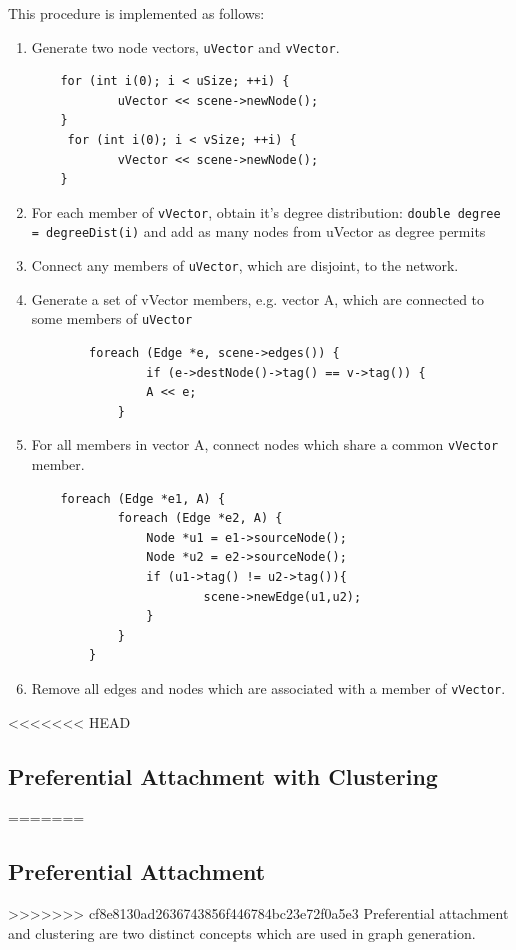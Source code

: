 \documentclass[a4paper,11pt,titlepage]{article}
\newcommand{\code}[1]{\texttt{#1}}
\begin{document}
This procedure is implemented as follows:
\begin{enumerate}
   \item Generate two node vectors, \code{uVector} and \code{vVector}.
\begin{lstlisting}
	for (int i(0); i < uSize; ++i) {
        	uVector << scene->newNode();
	}
	 for (int i(0); i < vSize; ++i) {
        	vVector << scene->newNode();
	}
\end{lstlisting}
   \item For each member of \code{vVector}, obtain it's degree distribution:
\code{double degree = degreeDist(i)} and add as many nodes from uVector as degree permits
   \item Connect any members of \code{uVector}, which are disjoint, to the network.
   \item Generate a set of vVector members, e.g. vector A, which are connected to some members of \code{uVector}
\begin{lstlisting}
       	foreach (Edge *e, scene->edges()) {
            	if (e->destNode()->tag() == v->tag()) {
                A << e;
            }
\end{lstlisting}
   \item For all members in vector A, connect nodes which share a common \code{vVector} member.
\begin{lstlisting}
	foreach (Edge *e1, A) {
            foreach (Edge *e2, A) {
                Node *u1 = e1->sourceNode();
                Node *u2 = e2->sourceNode();
                if (u1->tag() != u2->tag()){
                        scene->newEdge(u1,u2);
                }
            }
        }
\end{lstlisting}
   \item Remove all edges and nodes which are associated with a member of \code{vVector}.
\end{enumerate}

<<<<<<< HEAD

\subsection{Preferential Attachment with Clustering}
=======
\subsection{Preferential Attachment}
>>>>>>> cf8e8130ad2636743856f446784bc23e72f0a5e3
Preferential attachment and clustering are two distinct concepts which are used in graph generation.
\end{document}
